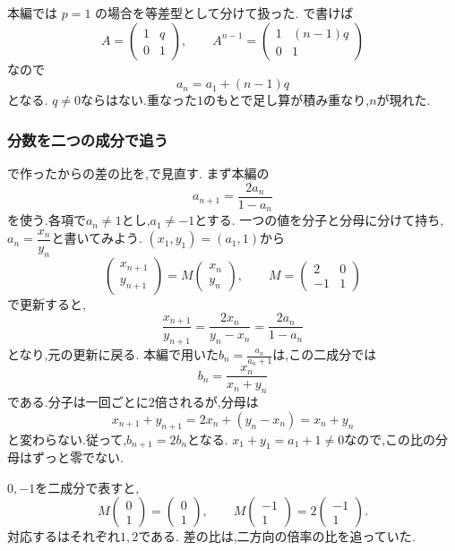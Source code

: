 本編では $p=1$ の場合を等差型として分けて扱った.
で書けば
\[
  A=\begin{pmatrix}1&q\\0&1\end{pmatrix},
  \qquad
  A^{n-1}=\begin{pmatrix}1&(n-1)q\\0&1\end{pmatrix}
\]
なので
\[
  a_n=a_1+(n-1)q
\]
となる.
$q\ne0$ならはない.重なった$1$のもとで足し算が積み重なり,$n$が現れた.



\subsubsection{分数を二つの成分で追う}\label{節：分数を二つの成分で追う}

で作ったからの差の比を,で見直す.
まず本編の
\[
  a_{n+1}=\frac{2a_n}{1-a_n}
\]
を使う.各項で$a_n\ne1$とし,$a_1\ne-1$とする.
一つの値を分子と分母に分けて持ち,$a_n=\dfrac{x_n}{y_n}$と書いてみよう.
$(x_1,y_1)=(a_1,1)$から
\[
  \begin{pmatrix}x_{n+1}\\y_{n+1}\end{pmatrix}
  =M\begin{pmatrix}x_n\\y_n\end{pmatrix},
  \qquad
  M=\begin{pmatrix}2&0\\-1&1\end{pmatrix}
\]
で更新すると,
\[
  \frac{x_{n+1}}{y_{n+1}}
  =\frac{2x_n}{y_n-x_n}
  =\frac{2a_n}{1-a_n}
\]
となり,元の更新に戻る.
本編で用いた$\displaystyle b_n=\frac{a_n}{a_n+1}$は,この二成分では
\[
  b_n=\frac{x_n}{x_n+y_n}
\]
である.分子は一回ごとに$2$倍されるが,分母は
\[
  x_{n+1}+y_{n+1}=2x_n+(y_n-x_n)=x_n+y_n
\]
と変わらない.従って,$b_{n+1}=2b_n$となる.
$x_1+y_1=a_1+1\ne0$なので,この比の分母はずっと零でない.

$0,-1$を二成分で表すと,
\[
  M\begin{pmatrix}0\\1\end{pmatrix}
  =\begin{pmatrix}0\\1\end{pmatrix},
  \qquad
  M\begin{pmatrix}-1\\1\end{pmatrix}
  =2\begin{pmatrix}-1\\1\end{pmatrix}.
\]
対応するはそれぞれ$1,2$である.
差の比は,二方向の倍率の比を追っていた.

